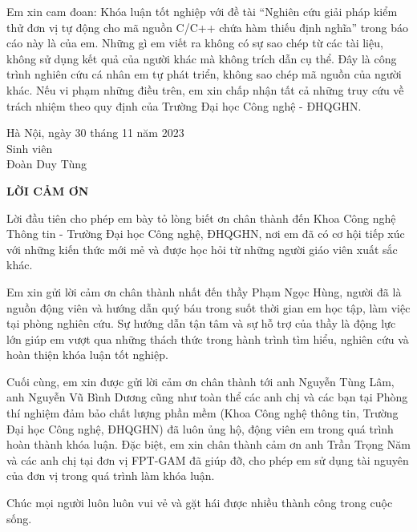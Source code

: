 Em xin cam đoan: Khóa luận tốt nghiệp với đề tài “Nghiên cứu giải pháp kiểm thử đơn vị tự động cho mã nguồn C/C++ chứa hàm thiếu định nghĩa” trong báo cáo này là của em. Những gì em viết ra không có sự sao chép từ các tài liệu, không sử dụng kết quả của người khác mà không trích dẫn cụ thể. Đây là công trình nghiên cứu cá nhân em tự phát triển, không sao chép mã nguồn của người khác. Nếu vi phạm những điều trên, em xin chấp nhận tất cả những truy cứu về trách nhiệm theo quy định của Trường Đại học Công nghệ - ĐHQGHN.

\begin{flushright}
	\begin{varwidth}{\linewidth}\centering
		Hà Nội, ngày 30 tháng 11 năm 2023\\
		Sinh viên\\[2cm]
		Đoàn Duy Tùng
	\end{varwidth}
\end{flushright}

\newpage

\begin{center}
    \textbf{LỜI CẢM ƠN}
\end{center}

Lời đầu tiên cho phép em bày tỏ lòng biết ơn chân thành đến  Khoa Công nghệ Thông tin - Trường Đại học Công nghệ, ĐHQGHN, nơi em đã có cơ hội tiếp xúc với những kiến thức mới mẻ và được học hỏi từ những người giáo viên xuất sắc khác.

Em xin gửi lời cảm ơn chân thành nhất đến thầy Phạm Ngọc Hùng, người đã là nguồn động viên và hướng dẫn quý báu trong suốt thời gian em học tập, làm việc tại phòng nghiên cứu. Sự hướng dẫn tận tâm và sự hỗ trợ của thầy là động lực lớn giúp em vượt qua những thách thức trong hành trình tìm hiểu, nghiên cứu và hoàn thiện khóa luận tốt nghiệp.

Cuối cùng, em xin được gửi lời cảm ơn chân thành tới anh Nguyễn Tùng Lâm, anh Nguyễn Vũ Bình Dương cũng như toàn thể các anh chị và các bạn tại Phòng thí nghiệm đảm bảo chất lượng phần mềm (Khoa Công nghệ thông tin, Trường Đại học Công nghệ, ĐHQGHN) đã luôn ủng hộ, động viên em trong quá trình hoàn thành khóa luận. Đặc biệt, em xin chân thành cảm ơn anh Trần Trọng Năm và các anh chị tại đơn vị FPT-GAM đã giúp đỡ, cho phép em sử dụng tài nguyên của đơn vị trong quá trình làm khóa luận.

Chúc mọi người luôn luôn vui vẻ và gặt hái được nhiều thành công trong cuộc sống.

